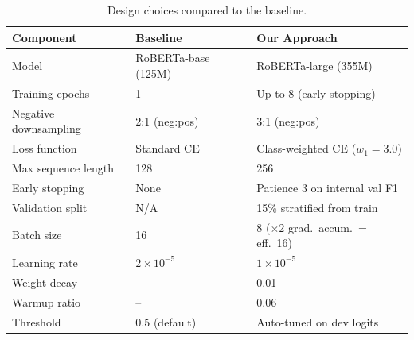 \documentclass[11pt,a4paper]{article}
\begin{document}
\begin{table}[H]
\centering
\caption{Design choices compared to the baseline.}
\label{tab:design}
\begin{tabular}{lll}
\toprule
\textbf{Component} & \textbf{Baseline} & \textbf{Our Approach} \\
\midrule
Model & RoBERTa-base (125M) & RoBERTa-large (355M) \\
Training epochs & 1 & Up to 8 (early stopping) \\
Negative downsampling & 2:1 (neg:pos) & 3:1 (neg:pos) \\
Loss function & Standard CE & Class-weighted CE ($w_1 = 3.0$) \\
Max sequence length & 128 & 256 \\
Early stopping & None & Patience 3 on internal val F1 \\
Validation split & N/A & 15\% stratified from train \\
Batch size & 16 & 8 ($\times$2 grad.\ accum.\ = eff.\ 16) \\
Learning rate & $2 \times 10^{-5}$ & $1 \times 10^{-5}$ \\
Weight decay & -- & 0.01 \\
Warmup ratio & -- & 0.06 \\
Threshold & 0.5 (default) & Auto-tuned on dev logits \\
\bottomrule
\end{tabular}
\end{table}
\end{document}
